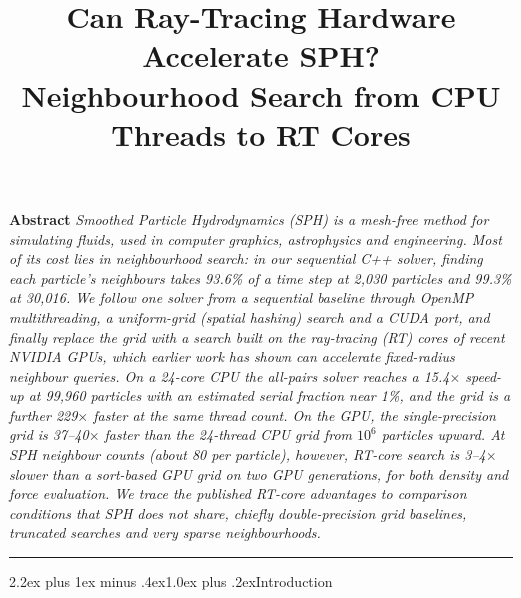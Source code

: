 \documentclass[conference]{IEEEtran}
\makeatletter
\renewcommand\section{\@startsection{section}{1}{\z@}%
  {2.2ex plus 1ex minus .4ex}{1.0ex plus .2ex}{\normalfont\large\bfseries}}
\renewenvironment{abstract}%
  {\noindent\small\textbf{Abstract}\hspace{0.6em}\itshape\ignorespaces}%
  {\par\vspace{0.8ex}\noindent\rule{\columnwidth}{0.4pt}\par\vspace{0.4ex}}
\makeatother
\begin{document}
\title{\bfseries Can Ray-Tracing Hardware Accelerate SPH?\\
Neighbourhood Search from CPU Threads to RT Cores}

\author{
}

\maketitle

\begin{abstract}
Smoothed Particle Hydrodynamics (SPH) is a mesh-free method for simulating fluids, used in computer graphics, astrophysics and engineering. Most of its cost lies in neighbourhood search: in our sequential C++ solver, finding each particle's neighbours takes 93.6\% of a time step at 2,030 particles and 99.3\% at 30,016. We follow one solver from a sequential baseline through OpenMP multithreading, a uniform-grid (spatial hashing) search and a CUDA port, and finally replace the grid with a search built on the ray-tracing (RT) cores of recent NVIDIA GPUs, which earlier work has shown can accelerate fixed-radius neighbour queries. On a 24-core CPU the all-pairs solver reaches a 15.4$\times$ speed-up at 99,960 particles with an estimated serial fraction near 1\%, and the grid is a further 229$\times$ faster at the same thread count. On the GPU, the single-precision grid is 37--40$\times$ faster than the 24-thread CPU grid from $10^6$ particles upward. At SPH neighbour counts (about 80 per particle), however, RT-core search is 3--4$\times$ slower than a sort-based GPU grid on two GPU generations, for both density and force evaluation. We trace the published RT-core advantages to comparison conditions that SPH does not share, chiefly double-precision grid baselines, truncated searches and very sparse neighbourhoods.
\end{abstract}

\section{Introduction}
\end{document}

